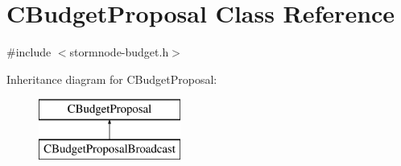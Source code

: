 \hypertarget{class_c_budget_proposal}{}\section{C\+Budget\+Proposal Class Reference}
\label{class_c_budget_proposal}


{\ttfamily \#include $<$stormnode-\/budget.\+h$>$}

Inheritance diagram for C\+Budget\+Proposal\+:\begin{figure}[H]
\begin{center}
\leavevmode
\includegraphics[height=2.000000cm]{class_c_budget_proposal}
\end{center}
\end{figure}
